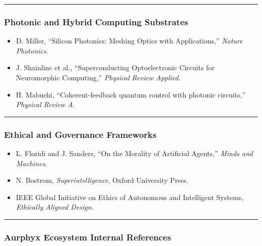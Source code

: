 \begin{center}\rule{0.5\linewidth}{0.5pt}\end{center}

\subsubsection{Photonic and Hybrid Computing Substrates}\label{photonic-and-hybrid-computing-substrates}

\begin{itemize}
\tightlist
\item
  D. Miller, ``Silicon Photonics: Meshing Optics with Applications,'' \emph{Nature Photonics}.
\item
  J. Shainline et al., ``Superconducting Optoelectronic Circuits for Neuromorphic Computing,'' \emph{Physical Review Applied}.
\item
  H. Mabuchi, ``Coherent-feedback quantum control with photonic circuits,'' \emph{Physical Review A}.
\end{itemize}

\begin{center}\rule{0.5\linewidth}{0.5pt}\end{center}

\subsubsection{Ethical and Governance Frameworks}\label{ethical-and-governance-frameworks}

\begin{itemize}
\tightlist
\item
  L. Floridi and J. Sanders, ``On the Morality of Artificial Agents,'' \emph{Minds and Machines}.
\item
  N. Bostrom, \emph{Superintelligence}, Oxford University Press.
\item
  IEEE Global Initiative on Ethics of Autonomous and Intelligent Systems, \emph{Ethically Aligned Design}.
\end{itemize}

\begin{center}\rule{0.5\linewidth}{0.5pt}\end{center}

\subsubsection{Aurphyx Ecosystem Internal References}\label{aurphyx-ecosystem-internal-references}


